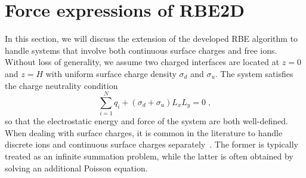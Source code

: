 

\section{Force expressions of RBE2D}\label{app::surfacecharge}

In this section, we will discuss the extension of the developed RBE algorithm to handle systems that involve both continuous surface charges and free ions. Without loss of generality, we assume two charged interfaces are located at $z=0$ and $z=H$ with uniform surface charge density $\sigma_d$ and $\sigma_u$. The system satisfies the charge neutrality condition \begin{equation}\label{eq::chargeneutrality}
    \sum_{i=1}^N q_i+(\sigma_d+\sigma_u)L_xL_y=0\;,
\end{equation}
so that the electrostatic energy and force of the system are both well-defined. When dealing with surface charges, it is common in the literature to handle discrete ions and continuous surface charges separately~\cite{spohr1997effect,yi2017note,yuan2021particle}. The former is typically treated as an infinite summation problem, while the latter is often obtained by solving an additional Poisson equation. %

